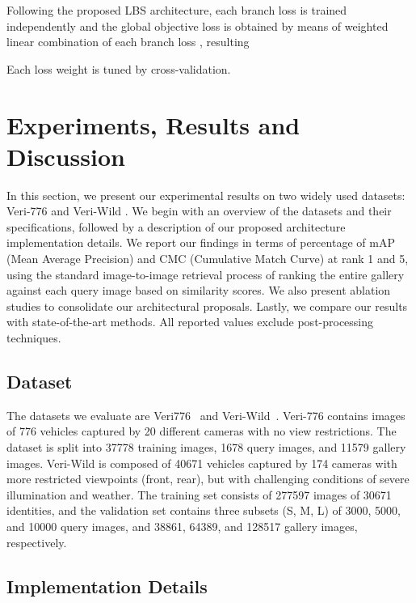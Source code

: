 \documentclass[letterpaper, 10pt, conference]{ieeeconf}
\begin{document}
Following the proposed LBS architecture, each branch loss is trained independently and the global objective loss  is obtained by means of weighted linear combination of each branch loss , resulting





Each loss weight  is tuned by cross-validation.





\section{Experiments, Results and Discussion}
In this section, we present our experimental results on two widely used datasets: Veri-776 \cite{liu2016deep} and Veri-Wild \cite{lou2019veri}. We begin with an overview of the datasets and their specifications, followed by a description of our proposed architecture implementation details. We report our findings in terms of percentage of mAP (Mean Average Precision) and CMC (Cumulative Match Curve) at rank 1 and 5, using the standard image-to-image retrieval process of ranking the entire gallery against each query image based on similarity scores. We also present ablation studies to consolidate our architectural proposals. Lastly, we compare our results with state-of-the-art methods. All reported values exclude post-processing techniques.

\subsection{Dataset}

The datasets we evaluate are Veri776~\cite{liu2016deep} and Veri-Wild~\cite{lou2019veri}. 
Veri-776 contains images of 776 vehicles captured by 20 different cameras with no view restrictions. The dataset is split into 37778 training images, 1678 query images, and 11579 gallery images.
Veri-Wild is composed of 40671 vehicles captured by 174 cameras with more restricted viewpoints (front, rear), but with challenging conditions of severe illumination and weather. The training set consists of 277597 images of 30671 identities, and the validation set contains three subsets (S, M, L) of 3000, 5000, and 10000 query images, and 38861, 64389, and 128517 gallery images, respectively.



\subsection{Implementation Details}
\end{document}
